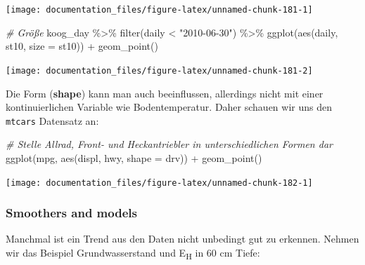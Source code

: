 \documentclass[
]{article}
\newenvironment{Shaded}{\begin{snugshade}}{\end{snugshade}}
\newcommand{\AttributeTok}[1]{\textcolor[rgb]{0.77,0.63,0.00}{#1}}
\newcommand{\CommentTok}[1]{\textcolor[rgb]{0.56,0.35,0.01}{\textit{#1}}}
\newcommand{\FunctionTok}[1]{\textcolor[rgb]{0.00,0.00,0.00}{#1}}
\newcommand{\NormalTok}[1]{#1}
\newcommand{\SpecialCharTok}[1]{\textcolor[rgb]{0.00,0.00,0.00}{#1}}
\newcommand{\StringTok}[1]{\textcolor[rgb]{0.31,0.60,0.02}{#1}}
\begin{document}
\begin{center}\texttt{[image: documentation\_files/figure-latex/unnamed-chunk-181-1]} \end{center}

\begin{Shaded}
\begin{Highlighting}[]
\CommentTok{\# Größe}
\NormalTok{koog\_day }\SpecialCharTok{\%\textgreater{}\%}
  \FunctionTok{filter}\NormalTok{(daily }\SpecialCharTok{\textless{}} \StringTok{"2010{-}06{-}30"}\NormalTok{) }\SpecialCharTok{\%\textgreater{}\%}
  \FunctionTok{ggplot}\NormalTok{(}\FunctionTok{aes}\NormalTok{(daily, st10, }\AttributeTok{size =}\NormalTok{ st10)) }\SpecialCharTok{+}
  \FunctionTok{geom\_point}\NormalTok{()}
\end{Highlighting}
\end{Shaded}

\begin{center}\texttt{[image: documentation\_files/figure-latex/unnamed-chunk-181-2]} \end{center}

Die Form (\textbf{shape}) kann man auch beeinflussen, allerdings nicht mit einer kontinuierlichen Variable wie Bodentemperatur. Daher schauen wir uns den \texttt{mtcars} Datensatz an:

\begin{Shaded}
\begin{Highlighting}[]
\CommentTok{\# Stelle Allrad, Front{-} und Heckantriebler in unterschiedlichen Formen dar}
\FunctionTok{ggplot}\NormalTok{(mpg, }\FunctionTok{aes}\NormalTok{(displ, hwy, }\AttributeTok{shape =}\NormalTok{ drv)) }\SpecialCharTok{+} 
  \FunctionTok{geom\_point}\NormalTok{()}
\end{Highlighting}
\end{Shaded}

\begin{center}\texttt{[image: documentation\_files/figure-latex/unnamed-chunk-182-1]} \end{center}

\hypertarget{smoothers-and-models}{%
\subsubsection{Smoothers and models}\label{smoothers-and-models}}

Manchmal ist ein Trend aus den Daten nicht unbedingt gut zu erkennen. Nehmen wir das Beispiel Grundwasserstand und E\textsubscript{H} in 60 cm Tiefe:
\end{document}
